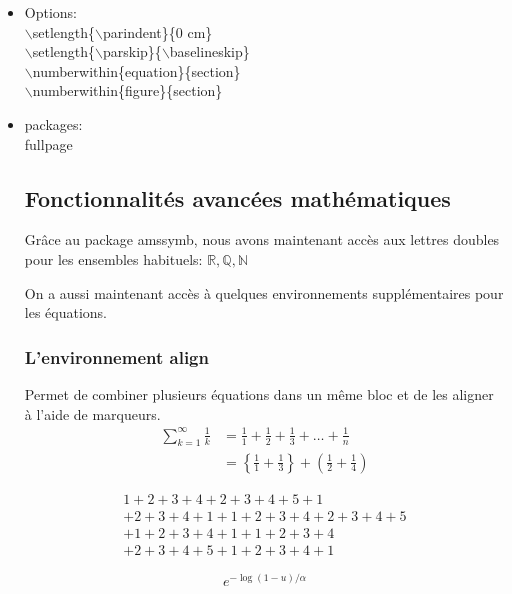 \documentclass[letterpaper, french, 12pt]{article} %
\numberwithin{equation}{section}
\numberwithin{figure}{section}
\begin{document}
\begin{itemize}
    \item Options:\\
    $\backslash$setlength\{$\backslash$parindent\}\{0 cm\}\\
    $\backslash$setlength\{$\backslash$parskip\}\{$\backslash$baselineskip\}
    \\
    $\backslash$numberwithin\{equation\}\{section\}\\
    $\backslash$numberwithin\{figure\}\{section\}
    
    \item packages:\\
    fullpage
    
\subsection{Fonctionnalités avancées mathématiques}
Grâce au package amssymb, nous avons maintenant accès aux lettres doubles pour les ensembles habituels: $\mathbb{R}, \mathbb{Q}, \mathbb{N}$

On a aussi maintenant accès à quelques environnements supplémentaires pour les équations.

\subsubsection{L'environnement align}
Permet de combiner plusieurs équations dans un même bloc et de les aligner à l'aide de marqueurs.
\begin{align}
    \sum_{k=1}^{\infty} \frac{1}{k} &= \frac{1}{1} + \frac{1}{2} + \frac{1}{3} + \dots + \frac{1}{n}\\
    &= \left\{\frac{1}{1} + \frac{1}{3}\right\}
    + \left(\frac{1}{2} +
    \frac{1}{4}\right)
\end{align}

\begin{equation}
    \begin{split}
        1 + 2 + 3 + 4 + 2 + 3 + 4 + 5 + 1 \\
        + 2 + 3 + 4 + 1 + 1 + 2 + 3 + 4 + 2 + 3 + 4 + 5\\
        + 1 + 2 + 3 + 4 + 1 + 1 + 2 + 3 + 4 \\
        + 2 + 3 + 4 + 5 + 1 + 2 + 3 + 4 + 1
    \end{split}
\end{equation}

\begin{equation}
    e^{-\log(1-u)/\alpha}
\end{equation}

\end{itemize}
\end{document}
